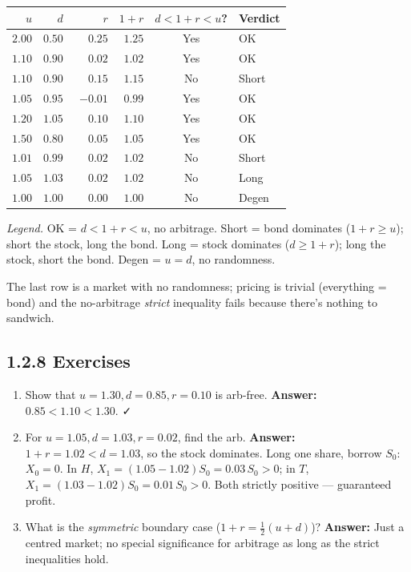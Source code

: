 \documentclass[
  10pt,
  twoside]{book}
\newcounter{none} %
\providecommand{\tightlist}{%
  \setlength{\itemsep}{0pt}\setlength{\parskip}{0pt}}
\begin{document}
{\def\LTcaptype{none} %
\begin{table}[H]
\centering
\begin{tabular}{|r|r|r|r|c|l|}
\toprule
\(u\) & \(d\) & \(r\) & \(1+r\) & \(d<1+r<u\)? & Verdict \\
\midrule



\(2.00\) & \(0.50\) & \(\phantom{-}0.25\) & \(1.25\) & Yes & OK \\
\(1.10\) & \(0.90\) & \(\phantom{-}0.02\) & \(1.02\) & Yes & OK \\
\(1.10\) & \(0.90\) & \(\phantom{-}0.15\) & \(1.15\) & No & Short \\
\(1.05\) & \(0.95\) & \(-0.01\) & \(0.99\) & Yes & OK \\
\(1.20\) & \(1.05\) & \(\phantom{-}0.10\) & \(1.10\) & Yes & OK \\
\(1.50\) & \(0.80\) & \(\phantom{-}0.05\) & \(1.05\) & Yes & OK \\
\(1.01\) & \(0.99\) & \(\phantom{-}0.02\) & \(1.02\) & No & Short \\
\(1.05\) & \(1.03\) & \(\phantom{-}0.02\) & \(1.02\) & No & Long \\
\(1.00\) & \(1.00\) & \(\phantom{-}0.00\) & \(1.00\) & No & Degen \\
\bottomrule
\end{tabular}
\end{table}
}

\emph{Legend.} OK = \(d<1+r<u\), no arbitrage. Short = bond dominates
(\(1+r\ge u\)); short the stock, long the bond. Long = stock dominates
(\(d\ge 1+r\)); long the stock, short the bond. Degen = \(u=d\), no
randomness.

The last row is a market with no randomness; pricing is trivial
(everything = bond) and the no-arbitrage \emph{strict} inequality fails
because there's nothing to sandwich.

\subsection{1.2.8 Exercises}\label{exercises-12}

\begin{enumerate}
\def\labelenumi{\arabic{enumi}.}
\tightlist
\item
  Show that \(u=1.30, d=0.85, r=0.10\) is arb-free. \textbf{Answer:}
  \(0.85<1.10<1.30\). ✓
\item
  For \(u=1.05, d=1.03, r=0.02\), find the arb. \textbf{Answer:}
  \(1+r=1.02<d=1.03\), so the stock dominates. Long one share, borrow
  \(S_0\): \(X_0=0\). In \(H\),
  \(X_1 = (1.05-1.02)S_0 = 0.03\,S_0 > 0\); in \(T\),
  \(X_1 = (1.03-1.02)S_0 = 0.01\,S_0 > 0\). Both strictly positive ---
  guaranteed profit.
\item
  What is the \emph{symmetric} boundary case
  (\(1+r = \tfrac{1}{2}(u+d)\))? \textbf{Answer:} Just a centred market;
  no special significance for arbitrage as long as the strict
  inequalities hold.
\end{enumerate}
\end{document}
